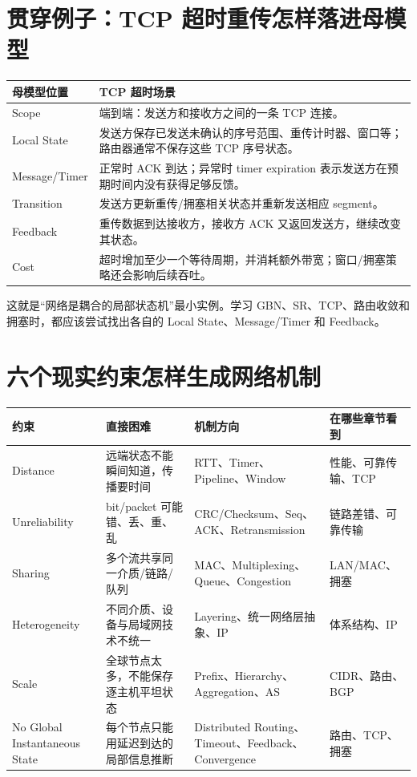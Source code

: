 \documentclass[11pt,a4paper,openany]{ctexbook}
\begin{document}
\section{贯穿例子：TCP 超时重传怎样落进母模型}
\begin{longtable}{L{2.8cm}L{\dimexpr\linewidth-3.65cm\relax}}
\toprule
\textbf{母模型位置} & \textbf{TCP 超时场景}\\
\midrule
Scope & 端到端：发送方和接收方之间的一条 TCP 连接。\\
Local State & 发送方保存已发送未确认的序号范围、重传计时器、窗口等；路由器通常不保存这些 TCP 序号状态。\\
Message/Timer & 正常时 ACK 到达；异常时 timer expiration 表示发送方在预期时间内没有获得足够反馈。\\
Transition & 发送方更新重传/拥塞相关状态并重新发送相应 segment。\\
Feedback & 重传数据到达接收方，接收方 ACK 又返回发送方，继续改变其状态。\\
Cost & 超时增加至少一个等待周期，并消耗额外带宽；窗口/拥塞策略还会影响后续吞吐。\\
\bottomrule
\end{longtable}
这就是“网络是耦合的局部状态机”最小实例。学习 GBN、SR、TCP、路由收敛和拥塞时，都应该尝试找出各自的 Local State、Message/Timer 和 Feedback。

\section{六个现实约束怎样生成网络机制}
\begin{longtable}{L{2.8cm}L{3.8cm}L{4.1cm}L{\dimexpr\linewidth-11.97cm\relax}}
\toprule
\textbf{约束} & \textbf{直接困难} & \textbf{机制方向} & \textbf{在哪些章节看到}\\
\midrule
Distance & 远端状态不能瞬间知道，传播要时间 & RTT、Timer、Pipeline、Window & 性能、可靠传输、TCP \\
Unreliability & bit/packet 可能错、丢、重、乱 & CRC/Checksum、Seq、ACK、Retransmission & 链路差错、可靠传输 \\
Sharing & 多个流共享同一介质/链路/队列 & MAC、Multiplexing、Queue、Congestion & LAN/MAC、拥塞 \\
Heterogeneity & 不同介质、设备与局域网技术不统一 & Layering、统一网络层抽象、IP & 体系结构、IP \\
Scale & 全球节点太多，不能保存逐主机平坦状态 & Prefix、Hierarchy、Aggregation、AS & CIDR、路由、BGP \\
No Global Instantaneous State & 每个节点只能用延迟到达的局部信息推断 & Distributed Routing、Timeout、Feedback、Convergence & 路由、TCP、拥塞 \\
\bottomrule
\end{longtable}
\end{document}
